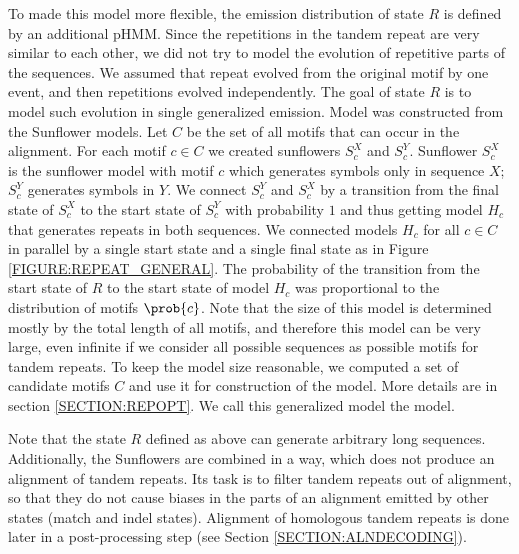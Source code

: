 To made this model more flexible, the emission distribution of state $R$ is
defined by an additional pHMM. Since the repetitions in the tandem repeat are
very similar to each other, we did not try to model the evolution of repetitive
parts of the sequences. We assumed that repeat evolved from the original motif
by one event, and then repetitions evolved independently. The goal of state $R$
is to model such evolution in single generalized emission. Model was
constructed from the Sunflower models. Let $C$ be the set of all motifs that
can occur in the alignment. For each motif $c\in C$ we created sunflowers
$S_c^X$ and $S_c^Y$.  Sunflower $S_c^X$ is the sunflower model with motif $c$
which generates symbols only in sequence $X$; $S_c^Y$ generates symbols in $Y$.
We connect $S_c^Y$ and $S_c^X$ by a transition from the final state of $S_c^X$
to the start state of $S_c^Y$ with probability $1$ and thus getting model $H_c$
that generates repeats in both sequences. We connected models $H_c$ for all
$c\in C$ in parallel by a single start state and a single final state as in
Figure \ref{FIGURE:REPEAT_GENERAL}. The probability of the transition from the
start state of $R$ to the start state of model $H_c$ was proportional to the
distribution of motifs $\prob{c}$. Note that the size of this model is
determined mostly by the total length of all motifs, and therefore this model
can be very large, even infinite if we consider all possible sequences as
possible motifs for tandem repeats.  To keep the model size reasonable, we
computed a set of candidate motifs $C$ and use it for construction of the
model. More details are in section \ref{SECTION:REPOPT}. We call this
generalized model the  model.

Note that the state $R$ defined as above can generate arbitrary long sequences.
Additionally, the Sunflowers are combined in a way, which does not produce an
alignment of tandem repeats.  Its task is to filter  tandem repeats out of
alignment, so that they do not cause biases in the parts of an alignment
emitted by other states (match and indel states). Alignment of homologous
tandem repeats is done later in a post-processing step (see Section
\ref{SECTION:ALNDECODING}).

